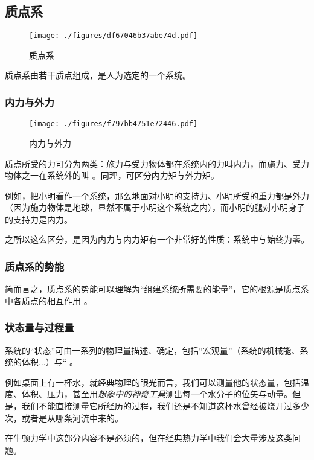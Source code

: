 
\subsection{质点系}
\begin{figure}[ht]
\centering
\texttt{[image: ./figures/df67046b37abe74d.pdf]}
\caption{质点系} \label{fig_MPTA_1}
\end{figure}
质点系由若干质点组成，是人为选定的一个系统。

\subsubsection{内力与外力}
\begin{figure}[ht]
\centering
\texttt{[image: ./figures/f797bb4751e72446.pdf]}
\caption{内力与外力} \label{fig_MPTA_2}
\end{figure}
质点所受的力可分为两类：施力与受力物体都在系统内的力叫内力，而施力、受力物体之一在系统外的叫 。同理，可区分内力矩与外力矩。

例如，把小明看作一个系统，那么地面对小明的支持力、小明所受的重力都是外力（因为施力物体是地球，显然不属于小明这个系统之内），而小明的腿对小明身子的支持力是内力。

之所以这么区分，是因为内力与内力矩有一个非常好的性质：系统中与始终为零。

\subsubsection{质点系的势能}
简而言之，质点系的势能可以理解为“组建系统所需要的能量”，它的根源是质点系中各质点的相互作用 。

\subsubsection{状态量与过程量}
系统的“状态”可由一系列的物理量描述、确定，包括“宏观量”（系统的机械能、系统的体积...）与“ 。

例如桌面上有一杯水，就经典物理的眼光而言，我们可以测量他的状态量，包括温度、体积、压力，甚至用\textsl{想象中的神奇工具}测出每一个水分子的位矢与动量。但是，我们不能直接测量它所经历的过程，我们还是不知道这杯水曾经被烧开过多少次，或者是从哪条河流中来的。

在牛顿力学中这部分内容不是必须的，但在经典热力学中我们会大量涉及这类问题。

